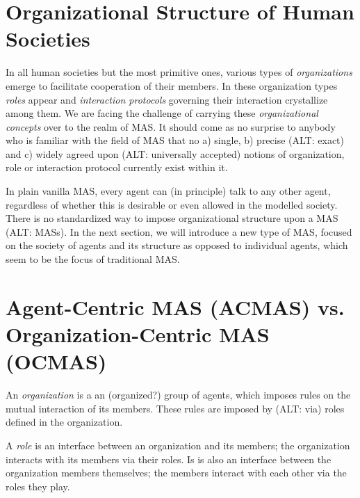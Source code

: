 \section{Organizational Structure of Human Societies}

In all human societies but the most primitive ones, various types of \textit{organizations} emerge to facilitate cooperation of their members.
In these organization types \textit{roles} appear and \textit{interaction protocols} governing their interaction crystallize among them.
We are facing the challenge of carrying these \textit{organizational concepts} over to the realm of MAS.
It should come as no surprise to anybody who is familiar with the field of MAS that no a) single, b) precise (ALT: exact) and c) widely agreed upon (ALT: universally accepted) notions of organization, role or interaction protocol currently exist within it.

In plain vanilla MAS, every agent can (in principle) talk to any other agent, regardless of whether this is desirable or even allowed in the modelled society.
There is no standardized way to impose organizational structure upon a MAS (ALT: MASs). 
In the next section, we will introduce a new type of MAS, focused on the society of agents and its structure as opposed to individual agents, which seem to be the focus of traditional MAS.

\section{Agent-Centric MAS (ACMAS) vs. Organization-Centric MAS (OCMAS)}



An \textit{organization} is a an (organized?) group of agents, which imposes rules on the mutual interaction of its members. 
These rules are imposed by (ALT: via) roles defined in the organization.

A \textit{role} is an interface between an organization and its members; the organization interacts with its members via their roles.
Is is also an interface between the organization members themselves; the members interact with each other via the roles they play.

